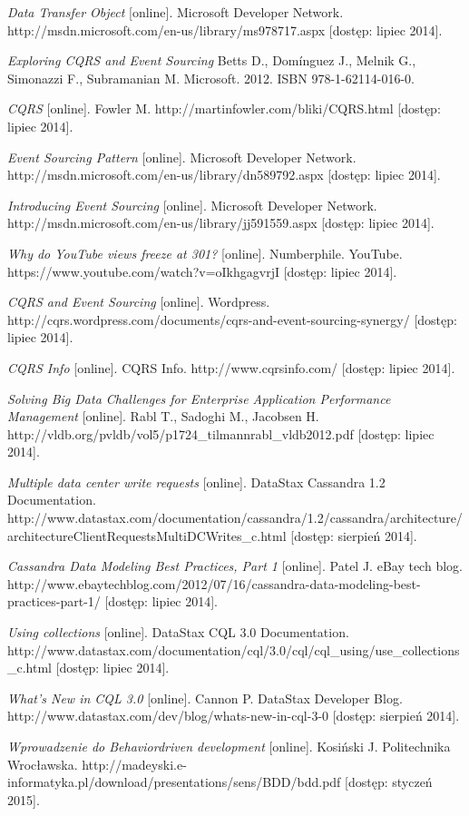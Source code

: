 \begin{thebibliography}{}
  \emph{Data Transfer Object} [online].
  Microsoft Developer Network.
  http://msdn.microsoft.com/en-us/library/ms978717.aspx [dostęp: lipiec 2014].
 
  \emph{Exploring CQRS and Event Sourcing}
  Betts D., Domínguez J., Melnik G., Simonazzi F., Subramanian M.
  Microsoft.
  2012.
  ISBN 978-1-62114-016-0.
 
  \emph{CQRS} [online].
  Fowler M.
  http://martinfowler.com/bliki/CQRS.html [dostęp: lipiec 2014].
 
  \emph{Event Sourcing Pattern} [online].
  Microsoft Developer Network.
  http://msdn.microsoft.com/en-us/library/dn589792.aspx [dostęp: lipiec 2014].
 
  \emph{Introducing Event Sourcing} [online].
  Microsoft Developer Network.
  http://msdn.microsoft.com/en-us/library/jj591559.aspx [dostęp: lipiec 2014].
 
  \emph{Why do YouTube views freeze at 301?} [online].
  Numberphile.
  YouTube.
  https://www.youtube.com/watch?v=oIkhgagvrjI [dostęp: lipiec 2014].
 
  \emph{CQRS and Event Sourcing} [online].
  Wordpress.
  http://cqrs.wordpress.com/documents/cqrs-and-event-sourcing-synergy/ [dostęp: lipiec 2014].
  
  \emph{CQRS Info} [online].
  CQRS Info.
  http://www.cqrsinfo.com/ [dostęp: lipiec 2014].
 
  \emph{Solving Big Data Challenges for Enterprise Application Performance Management} [online].
  Rabl T., Sadoghi M., Jacobsen H.
  http://vldb.org/pvldb/vol5/p1724\_tilmannrabl\_vldb2012.pdf [dostęp: lipiec 2014].
 
  \emph{Multiple data center write requests} [online].
  DataStax Cassandra 1.2 Documentation.
  http://www.datastax.com/documentation/cassandra/1.2/cassandra/architecture/architectureClientRequestsMultiDCWrites\_c.html [dostęp: sierpień 2014].
 
  \emph{Cassandra Data Modeling Best Practices, Part 1} [online].
  Patel J.
  eBay tech blog.
  http://www.ebaytechblog.com/2012/07/16/cassandra-data-modeling-best-practices-part-1/ [dostęp: lipiec 2014].
 
  \emph{Using collections} [online].
  DataStax CQL 3.0 Documentation.
  http://www.datastax.com/documentation/cql/3.0/cql/cql\_using/use\_collections\_c.html [dostęp: lipiec 2014].
 
  \emph{What’s New in CQL 3.0} [online].
  Cannon P.
  DataStax Developer Blog.
  http://www.datastax.com/dev/blog/whats-new-in-cql-3-0 [dostęp: sierpień 2014].

  \emph{Wprowadzenie do Behaviordriven development} [online].
  Kosiński J.
  Politechnika Wrocławska.
  http://madeyski.e-informatyka.pl/download/presentations/sens/BDD/bdd.pdf [dostęp: styczeń 2015].
  
\end{thebibliography}
